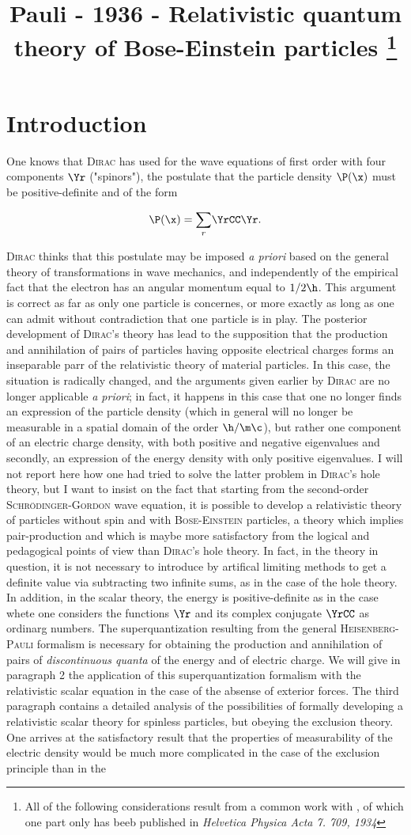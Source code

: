 \documentclass{article}
\title{Pauli - 1936 - Relativistic quantum theory of Bose-Einstein particles \footnote{All of the following considerations result from a common work with \sc{M. V. Weisskopf}, of which one part only has beeb published in \it{Helvetica Physica Acta} 7. 709, 1934}}
\renewcommand{\it}[1]{\textit{#1}}
\renewcommand{\sc}[1]{\textsc{#1}}
\newcommand{\sumr}{\underset{r}{\sum}}
\newcommand{\uequ}[1]{
\begin{equation*}
#1
\end{equation*}
}
\begin{document}
\section{Introduction}

One knows that \sc{Dirac} has used for the wave equations of first order with four components $\Yr$
("spinors"), the postulate that the particle density $\P(\x)$ must be positive-definite and of the form

\uequ{
\P(\x) = \sumr\YrCC\Yr.
}

\sc{Dirac} thinks that this postulate may be imposed \it{a priori} based on the general theory of transformations in wave mechanics, and independently of the empirical fact that the electron has an angular momentum equal to $1/2 \h$. This argument is correct as far as only one particle is concernes, or more exactly as long as one can admit without contradiction that one particle is in play. The posterior development of \sc{Dirac}'s theory has lead to the supposition that the production and annihilation of pairs of particles having opposite electrical charges forms an inseparable parr of the relativistic theory of material particles. In this case, the situation is radically changed, and the arguments given earlier by \sc{Dirac} are no longer applicable \it{a priori}; in fact, it happens in this case that one no longer finds an expression of the particle density (which in general will no longer be measurable in a spatial domain of the order $\h/\m\c$), but rather one component of an electric charge density, with both positive and negative eigenvalues and secondly, an expression of the energy density with only positive eigenvalues. I will not report here how one had tried to solve the latter problem in \sc{Dirac}'s hole theory, but I want to insist on the fact that starting from the second-order \sc{Schrödinger-Gordon} wave equation, it is possible to develop a relativistic theory of particles without spin and with \sc{Bose-Einstein} particles, a theory which implies pair-production and which is maybe more satisfactory from the logical and pedagogical points of view than \sc{Dirac}'s hole theory. In fact, in the theory in question, it is not necessary to introduce by artifical limiting methods to get a definite value via subtracting two infinite sums, as in the case of the hole theory. In addition, in the scalar theory, the energy is positive-definite as in the case whete one considers the functions $\Yr$ and its complex conjugate $\YrCC$ as ordinarg numbers. The superquantization resulting from the general \sc{Heisenberg-Pauli} formalism is necessary for obtaining the production and annihilation of pairs of \it{discontinuous quanta} of the energy and of electric charge. We will give in paragraph 2 the application of this superquantization formalism with the relativistic scalar equation in the case of the absense of exterior forces. The third paragraph contains a detailed analysis of the possibilities of formally developing a relativistic scalar theory for spinless particles, but obeying the exclusion theory. One arrives at the satisfactory result that the properties of measurability of the electric density would be much more complicated in the case of the exclusion principle than in the 
\end{document}
